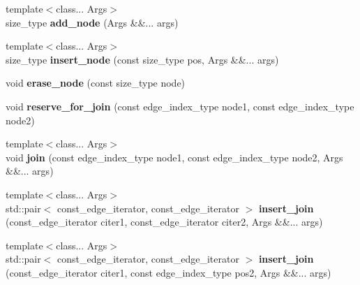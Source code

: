 \begin{DoxyCompactItemize}
{\footnotesize template$<$class... Args$>$ }\\size\+\_\+type {\bfseries add\+\_\+node} (Args \&\&... args)
\item 
\mbox{\label{classsequoia_1_1maths_1_1graph__primitive_a79d8a3fa997cad634d2eecd9ef319a1e}} 
{\footnotesize template$<$class... Args$>$ }\\size\+\_\+type {\bfseries insert\+\_\+node} (const size\+\_\+type pos, Args \&\&... args)
\item 
\mbox{\label{classsequoia_1_1maths_1_1graph__primitive_a768e22791d71f8b648aa012a251b51f2}} 
void {\bfseries erase\+\_\+node} (const size\+\_\+type node)
\item 
\mbox{\label{classsequoia_1_1maths_1_1graph__primitive_ada19de45b6e761a1b1380546951d4f9a}} 
void {\bfseries reserve\+\_\+for\+\_\+join} (const edge\+\_\+index\+\_\+type node1, const edge\+\_\+index\+\_\+type node2)
\item 
\mbox{\label{classsequoia_1_1maths_1_1graph__primitive_a2025970994d6fc6753a8d9da270455a5}} 
{\footnotesize template$<$class... Args$>$ }\\void {\bfseries join} (const edge\+\_\+index\+\_\+type node1, const edge\+\_\+index\+\_\+type node2, Args \&\&... args)
\item 
\mbox{\label{classsequoia_1_1maths_1_1graph__primitive_a4151c41ecc4e80575c3c96acbb9ca87e}} 
{\footnotesize template$<$class... Args$>$ }\\std\+::pair$<$ const\+\_\+edge\+\_\+iterator, const\+\_\+edge\+\_\+iterator $>$ {\bfseries insert\+\_\+join} (const\+\_\+edge\+\_\+iterator citer1, const\+\_\+edge\+\_\+iterator citer2, Args \&\&... args)
\item 
\mbox{\label{classsequoia_1_1maths_1_1graph__primitive_adbc223d6067de93b1c92dbe2130c08d4}} 
{\footnotesize template$<$class... Args$>$ }\\std\+::pair$<$ const\+\_\+edge\+\_\+iterator, const\+\_\+edge\+\_\+iterator $>$ {\bfseries insert\+\_\+join} (const\+\_\+edge\+\_\+iterator citer1, const edge\+\_\+index\+\_\+type pos2, Args \&\&... args)

\end{DoxyCompactItemize}

